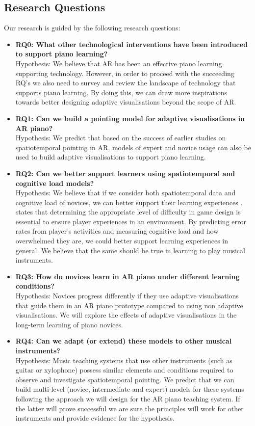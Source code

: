 \documentclass[manuscript,screen]{acmart}
\begin{document}
\subsection{Research Questions}
Our research is guided by the following research questions: 
\begin{itemize}
    \item \textbf{RQ0: What other technological interventions have been introduced to support piano learning?}\\
    Hypothesis: We believe that AR has been an effective piano learning supporting technology. However, in order to proceed with the succeeding RQ's we also need to survey and review the landscape of technology that supports piano learning. By doing this, we can draw more inspirations towards better designing adaptive visualisations beyond the scope of AR. 
    \item \textbf{RQ1: Can we build a pointing model for adaptive visualisations in AR piano?} \\
    Hypothesis: We predict that based on the success of earlier studies on spatiotemporal pointing in AR, models of expert and novice usage can also be used to build adaptive visualisations to support piano learning. 
    \item \textbf{RQ2: Can we better support learners using spatiotemporal and cognitive load models?}\\
    Hypothesis: We believe that if we consider both spatiotemporal data and cognitive load of novices, we can better support their learning experiences \cite{rikers2004cognitive}. \citet{lee2016website} states that determining the appropriate level of difficulty in game design is essential to ensure player experiences in an environment. By predicting error rates from player's activities and measuring cognitive load and how overwhelmed they are, we could better support learning experiences in general. We believe that the same should be true in learning to play musical instruments.
    \item \textbf{RQ3: How do novices learn in AR piano under different learning conditions?}\\
    Hypothesis: Novices progress differently if they use adaptive visualisations that guide them in an AR piano prototype compared to using non adaptive visualisations. We will explore the effects of adaptive visualisations in the long-term learning of piano novices.
    \item \textbf{RQ4: Can we adapt (or extend) these models to other musical instruments?}\\
    Hypothesis: Music teaching systems that use other instruments (such as guitar or xylophone) possess similar elements and conditions required to observe and investigate spatiotemporal pointing. We predict that we can build multi-level (novice, intermediate and expert) models for these systems following the approach we will design for the AR piano teaching system. If the latter will prove successful we are sure the principles will work for other instruments and provide evidence for the hypothesis. 
\end{itemize}
\end{document}
